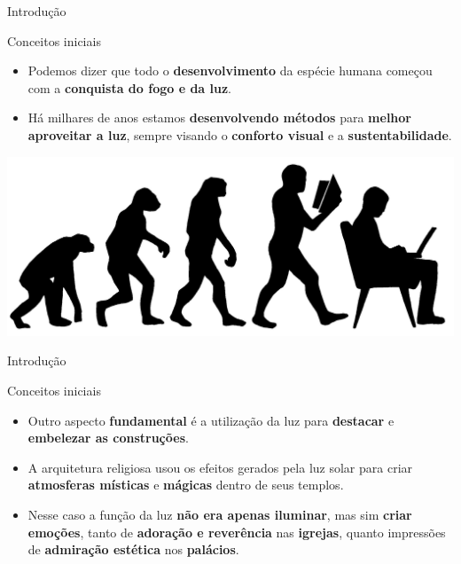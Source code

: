 \begin{frame}{Introdução}
	\begin{block}{Conceitos iniciais}
		\begin{itemize}
			\item Podemos dizer que todo o \textbf{desenvolvimento} da espécie humana começou com a \textbf{conquista do fogo e da luz}.
			\item Há milhares de anos estamos \textbf{desenvolvendo métodos} para \textbf{melhor aproveitar a luz}, sempre visando o \textbf{conforto visual} e a \textbf{sustentabilidade}.
		\end{itemize}
	\end{block}

	\bigskip
	\centering
	\includegraphics[width=0.8\linewidth]{Figuras/Ch07/fig1.3}

\end{frame}


\begin{frame}{Introdução}
	\begin{block}{Conceitos iniciais}
		\begin{itemize}
			\item Outro aspecto \textbf{fundamental} é a utilização da luz para \textbf{destacar} e \textbf{embelezar as construções}.
			\item A arquitetura religiosa usou os efeitos gerados pela luz solar para criar \textbf{atmosferas místicas} e \textbf{mágicas} dentro de seus templos.
			\item Nesse caso a função da luz \textbf{não era apenas iluminar}, mas sim \textbf{criar emoções}, tanto de \textbf{adoração e reverência} nas \textbf{igrejas}, quanto impressões de \textbf{admiração estética} nos \textbf{palácios}.
		\end{itemize}
	\end{block}
\end{frame}


